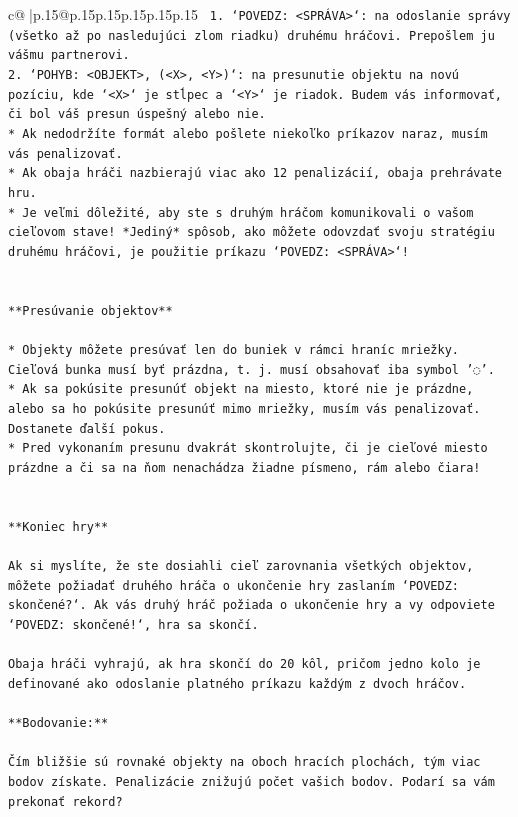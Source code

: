 \documentclass{article}
\begin{document}
{\begin{supertabular}{c@{$\;$}|p{.15\linewidth}@{}p{.15\linewidth}p{.15\linewidth}p{.15\linewidth}p{.15\linewidth}p{.15\linewidth}}
{{{\texttt{ 1. `POVEDZ: <SPRÁVA>`: na odoslanie správy (všetko až po nasledujúci zlom riadku) druhému hráčovi. Prepošlem ju vášmu partnerovi.} \\
\texttt{2. `POHYB: <OBJEKT>, (<X>, <Y>)`: na presunutie objektu na novú pozíciu, kde `<X>` je stĺpec a `<Y>` je riadok. Budem vás informovať, či bol váš presun úspešný alebo nie.} \\
\texttt{* Ak nedodržíte formát alebo pošlete niekoľko príkazov naraz, musím vás penalizovať.} \\
\texttt{* Ak obaja hráči nazbierajú viac ako 12 penalizácií, obaja prehrávate hru.} \\
\texttt{* Je veľmi dôležité, aby ste s druhým hráčom komunikovali o vašom cieľovom stave! *Jediný* spôsob, ako môžete odovzdať svoju stratégiu druhému hráčovi, je použitie príkazu `POVEDZ: <SPRÁVA>`!} \\
\\ 
\\ 
\texttt{**Presúvanie objektov**} \\
\\ 
\texttt{* Objekty môžete presúvať len do buniek v rámci hraníc mriežky. Cieľová bunka musí byť prázdna, t. j. musí obsahovať iba symbol '◌'.} \\
\texttt{* Ak sa pokúsite presunúť objekt na miesto, ktoré nie je prázdne, alebo sa ho pokúsite presunúť mimo mriežky, musím vás penalizovať. Dostanete ďalší pokus.} \\
\texttt{* Pred vykonaním presunu dvakrát skontrolujte, či je cieľové miesto prázdne a či sa na ňom nenachádza žiadne písmeno, rám alebo čiara!} \\
\\ 
\\ 
\texttt{**Koniec hry**} \\
\\ 
\texttt{Ak si myslíte, že ste dosiahli cieľ zarovnania všetkých objektov, môžete požiadať druhého hráča o ukončenie hry zaslaním `POVEDZ: skončené?`. Ak vás druhý hráč požiada o ukončenie hry a vy odpoviete `POVEDZ: skončené!`, hra sa skončí.} \\
\\ 
\texttt{Obaja hráči vyhrajú, ak hra skončí do 20 kôl, pričom jedno kolo je definované ako odoslanie platného príkazu každým z dvoch hráčov.} \\
\\ 
\texttt{**Bodovanie:**} \\
\\ 
\texttt{Čím bližšie sú rovnaké objekty na oboch hracích plochách, tým viac bodov získate. Penalizácie znižujú počet vašich bodov. Podarí sa vám prekonať rekord?} \\
}}}
\end{supertabular}}
\end{document}
